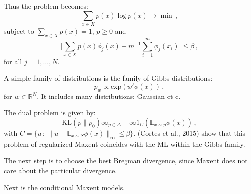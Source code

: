 \documentclass[a4paper]{article}
\newcommand{\Real}{\mathbb{R}}
\newcommand{\ex}{\mathbb{E}}
\begin{document}
Thus the problem becomes:
\[ \sum_{x\in X} p(x) \log p(x) \to \min \,, \]
subject to $\sum_{x\in X} p(x) = 1$, $p \geq 0$ and
\[ \bigl|\sum_{x\in X} p(x) \phi_j(x) - m^{-1} \sum_{i=1}^m \phi_j(x_i) \bigr|
    \leq \beta \,,\]
for all $j=1,\ldots, N$.

A simple family of distributions is the family of Gibbs distributions:
\[ p_w \propto \text{exp}(w' \phi(x)) \,, \]
for $w\in \Real^N$. It includes many distributions: Gaussian et c.

The dual problem is given by:
\[ \text{KL}(p\|p_0) \infty_{p\in \Delta} + \infty 1_C(\ex_{x\sim p} \phi(x)) \,,\]
with $C = \{u\,:\, \|u - \ex_{x\sim S} \phi(x) \|_\infty \leq \beta \}$. (Cortes
et al., 2015) show that this problem of regularized Maxent coincides with the ML
within the Gibbs family.

The next step is to choose the best Bregman divergence, since Maxent does not care
about the particular divergence.

\noindent Next is the conditional Maxent models.



% 
\end{document}
